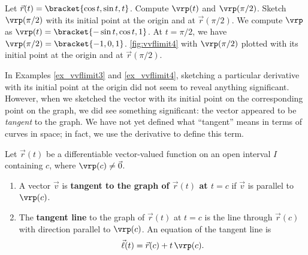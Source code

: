 \begin{example}\label{ex_vvflimit4}%
Let $\vec r(t) =\bracket{\cos t, \sin t, t}$. Compute $\vrp(t)$ and $\vrp(\pi/2)$. Sketch $\vrp(\pi/2)$ with its initial point at the origin and at $\vec r(\pi/2)$.
\solution
We compute $\vrp$ as $\vrp(t) =\bracket{-\sin t, \cos t, 1}$. At $t= \pi/2$, we have $\vrp(\pi/2) =\bracket{-1,0,1}$. \autoref{fig:vvflimit4}
\iftoggle{in_threeD}{shows a graph of $\vec r(t)$,}{shows two graphs of $\vec r(t)$, from different perspectives,}
with $\vrp(\pi/2)$ plotted with its initial point at the origin and at $\vec r(\pi/2)$.
\end{example}

In Examples \ref{ex_vvflimit3} and \ref{ex_vvflimit4}, sketching a particular derivative with its initial point at the origin did not seem to reveal anything significant. However, when we sketched the vector with its initial point on the corresponding point on the graph, we did see something significant: the vector appeared to be \emph{tangent} to the graph. We have not yet defined what ``tangent'' means in terms of curves in space; in fact, we use the derivative to define this term.

\begin{definition}\label{def:vector_tangent}%
Let $\vec r(t)$ be a differentiable vector-valued function on an open interval $I$ containing $c$, where $\vrp(c)\neq \vec 0$.
\begin{enumerate}
	\item A vector $\vec v$ is \textbf{tangent to the graph of $\vec r(t)$ at $t=c$} if $\vec v$ is parallel to $\vrp(c)$.
	\item	The \textbf{tangent line}  to the graph of $\vec r(t)$ at $t=c$ is the line through $\vec r(c)$ with direction parallel to $\vrp(c)$. An equation of the tangent line is 
	\[\vec \ell(t) = \vec r(c) + t\,\vrp(c).\]
\end{enumerate}
\end{definition}

